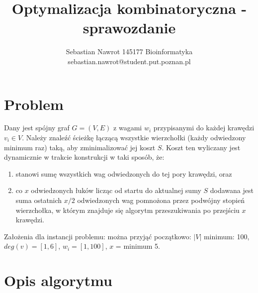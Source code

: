 \documentclass{article}
\title{Optymalizacja kombinatoryczna - sprawozdanie}
\date{}
\author{Sebastian Nawrot 145177 Bioinformatyka\\sebastian.nawrot@student.put.poznan.pl}
\begin{document}
\maketitle


\section{Problem}
Dany jest spójny graf $G=(V, E)$ z wagami $w_{i}$ przypisanymi do każdej
krawędzi $v_{i}\in V$. Należy znaleźć ścieżkę łączącą wszystkie wierzchołki
(każdy odwiedzony minimum raz) taką, aby zminimalizować jej koszt $S$. Koszt
ten wyliczany jest dynamicznie w trakcie konstrukcji w taki sposób, że:

\renewcommand{\labelenumi}{\alph{enumi}.}
\begin{enumerate}
  \item stanowi sumę wszystkich wag odwiedzonych do tej pory krawędzi, oraz
  \item co $x$ odwiedzonych łuków licząc od startu do aktualnej sumy $S$ dodawana jest
  suma ostatnich $x/2$ odwiedzonych wag pomnożona przez podwójny stopień
  wierzchołka, w którym znajduje się algorytm przeszukiwania po przejściu $x$ krawędzi.
\end{enumerate}

\noindent
Założenia dla instancji problemu: można przyjąć początkowo: $\left| V \right|$
minimum: 100, $deg(v) = \left[1, 6\right]$, $w_{i} = \left[1, 100\right]$, $x$ = minimum 5.



\section{Opis algorytmu}
\end{document}
